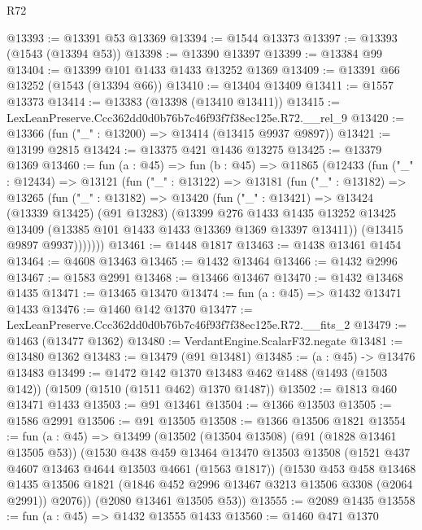 \begin{lexlean}{R72}
\begin{coremodule}
@13393 := @13391 @53 @13369
@13394 := @1544 @13373
@13397 := @13393 (@1543 (@13394 @53))
@13398 := @13390 @13397
@13399 := @13384 @99
@13404 := @13399 @101 @1433 @1433 @13252 @1369
@13409 := @13391 @66 @13252 (@1543 (@13394 @66))
@13410 := @13404 @13409
@13411 := @1557 @13373
@13414 := @13383 (@13398 (@13410 @13411))
@13415 := LexLeanPreserve.Ccc362dd0d0b76b7c46f93f7f38ec125e.R72.__rel_9
@13420 := @13366 (fun ("_" : @13200) => @13414 (@13415 @9937 @9897))
@13421 := @13199 @2815
@13424 := @13375 @421 @1436 @13275
@13425 := @13379 @1369
@13460 := fun (a : @45) =>
  fun (b : @45) =>
  @11865
    (@12433
      (fun ("_" : @12434) =>
      @13121
        (fun ("_" : @13122) =>
        @13181
          (fun ("_" : @13182) =>
          @13265
            (fun ("_" : @13182) =>
            @13420
              (fun ("_" : @13421) =>
              @13424
                (@13339 @13425)
                (@91 @13283)
                (@13399
                  @276
                  @1433
                  @1435
                  @13252
                  @13425
                  @13409
                  (@13385 @101 @1433 @1433 @13369 @1369 @13397 @13411))
                (@13415 @9897 @9937)))))))
@13461 := @1448 @1817
@13463 := @1438 @13461 @1454
@13464 := @4608 @13463
@13465 := @1432 @13464
@13466 := @1432 @2996
@13467 := @1583 @2991
@13468 := @13466 @13467
@13470 := @1432 @13468 @1435
@13471 := @13465 @13470
@13474 := fun (a : @45) => @1432 @13471 @1433
@13476 := @1460 @142 @1370
@13477 := LexLeanPreserve.Ccc362dd0d0b76b7c46f93f7f38ec125e.R72.__fits_2
@13479 := @1463 (@13477 @1362)
@13480 := VerdantEngine.ScalarF32.negate
@13481 := @13480 @1362
@13483 := @13479 (@91 @13481)
@13485 := (a : @45) -> @13476 @13483
@13499 := @1472
    @142
    @1370
    @13483
    @462
    @1488
    (@1493 (@1503 @142))
    (@1509 (@1510 (@1511 @462) @1370 @1487))
@13502 := @1813 @460 @13471 @1433
@13503 := @91 @13461
@13504 := @1366 @13503
@13505 := @1586 @2991
@13506 := @91 @13505
@13508 := @1366 @13506 @1821
@13554 := fun (a : @45) =>
  @13499
    (@13502
      (@13504 @13508)
      (@91 (@1828 @13461 @13505 @53))
      (@1530
        @438
        @459
        @13464
        @13470
        @13503
        @13508
        (@1521 @437 @4607 @13463 @4644 @13503 @4661 (@1563 @1817))
        (@1530
          @453
          @458
          @13468
          @1435
          @13506
          @1821
          (@1846 @452 @2996 @13467 @3213 @13506 @3308 (@2064 @2991))
          @2076))
      (@2080 @13461 @13505 @53))
@13555 := @2089 @1435
@13558 := fun (a : @45) => @1432 @13555 @1433
@13560 := @1460 @471 @1370

\end{coremodule}
\end{lexlean}
